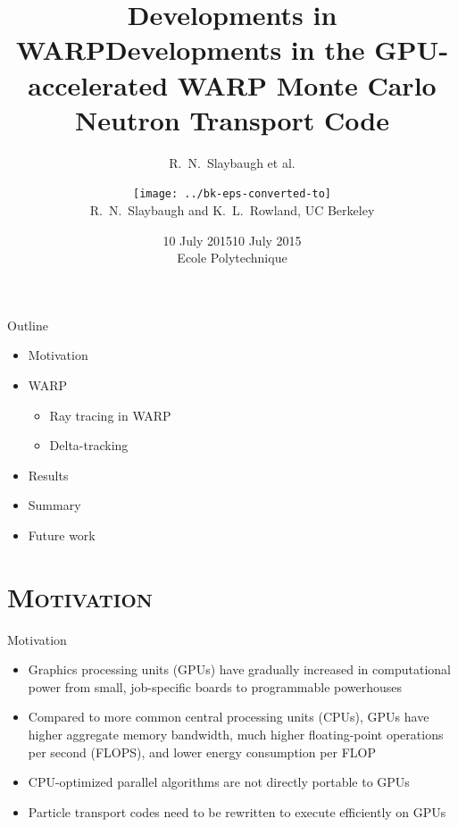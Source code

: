 \documentclass[xcolor=x11names, compress]{beamer}
\title{Developments in WARP}
\author{R.\ N.\ Slaybaugh et al.}
\date{10 July 2015}
\renewcommand{\(}{\begin{columns}}
\renewcommand{\)}{\end{columns}}
\newcommand{\<}[1]{\begin{column}{#1}}
\renewcommand{\>}{\end{column}}
\begin{document}
\begin{frame}
\title{Developments in the GPU-accelerated WARP Monte Carlo Neutron Transport Code}
\author{\texttt{[image: ../bk-eps-converted-to]}\\R.\ N.\ Slaybaugh and K.\ L.\ Rowland, UC Berkeley}%
\date{10 July 2015 \\ Ecole Polytechnique}
\titlepage
\end{frame}


\begin{frame}[fragile]{Outline}
	\begin{itemize}
	\item{Motivation}
	\item{WARP}
	\begin{itemize}
	    \item{Ray tracing in WARP}
	    \item{Delta-tracking}
	\end{itemize}
	\item{Results}
	\item{Summary}
	\item{Future work}
	\end{itemize}
\end{frame}


\section{\scshape Motivation}
\begin{frame}{Motivation}
	\begin{itemize}
	\item{Graphics processing units (GPUs) have gradually increased in computational power from small,
	job-specific boards to programmable powerhouses}
	\pause
	\item{Compared to more common central processing units (CPUs), GPUs have higher aggregate memory
	bandwidth, much higher floating-point operations per second (FLOPS), and lower energy consumption
	per FLOP \cite{warp}}
	\pause
	\item{CPU-optimized parallel algorithms are not directly portable to GPUs}
	\pause
	\item{Particle transport codes need to be rewritten to execute efficiently on GPUs 
	\cite{warp}}
	\end{itemize}
\end{frame}
\end{document}
